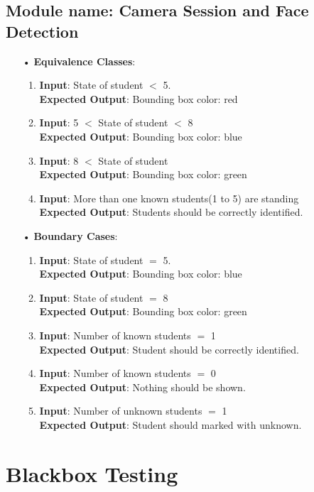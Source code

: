 \documentclass{scrreprt}
\begin{document}
\section{Module name: Camera Session and Face Detection}
\begin{itemize}
\item[•]\textbf{Equivalence Classes}:
\begin{enumerate}
\item \textbf{Input}: State of student $<$ 5.\\
\textbf{Expected Output}: Bounding box color: red
\item \textbf{Input}: 5 $<$ State of student $<$ 8\\
\textbf{Expected Output}: Bounding box color: blue
\item \textbf{Input}: 8 $<$ State of student\\
\textbf{Expected Output}: Bounding box color: green
\item \textbf{Input}: More than one known students(1 to 5) are standing\\
\textbf{Expected Output}: Students should be correctly identified.

\end{enumerate}
\item[•]\textbf{Boundary Cases}: 
\begin{enumerate}
\item \textbf{Input}: State of student $=$ 5.\\
\textbf{Expected Output}: Bounding box color: blue
\item \textbf{Input}: State of student $=$ 8\\
\textbf{Expected Output}: Bounding box color: green
\item \textbf{Input}: Number of known students $=$ 1\\
\textbf{Expected Output}: Student should be correctly identified.
\item \textbf{Input}: Number of known students $=$ 0\\
\textbf{Expected Output}: Nothing should be shown.
\item \textbf{Input}: Number of unknown students $=$ 1\\
\textbf{Expected Output}: Student should marked with unknown.

\end{enumerate}
\end{itemize}




\chapter{Blackbox Testing}
\end{document}

